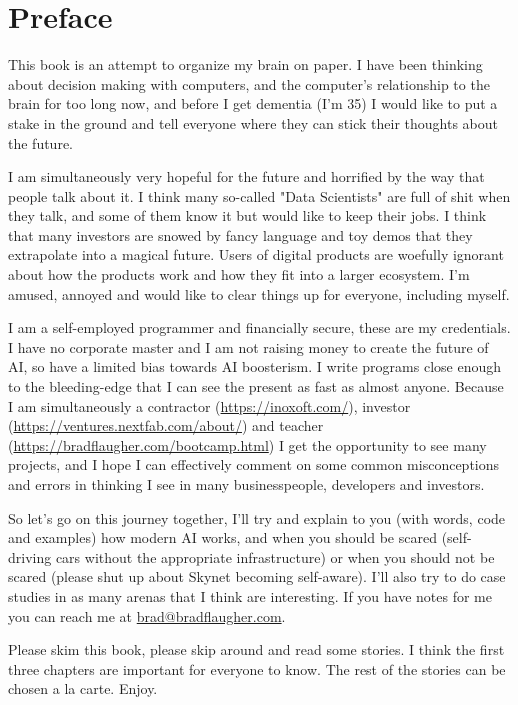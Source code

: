 \chapter*{Preface}

This book is an attempt to organize my brain on paper. I have been thinking about decision making with computers, and the computer's relationship to the brain for too long now, and before I get dementia (I'm 35) I would like to put a stake in the ground and tell everyone where they can stick their thoughts about the future. 

I am simultaneously very hopeful for the future and horrified by the way that people talk about it. I think many so-called "Data Scientists" are full of shit when they talk, and some of them know it but would like to keep their jobs. I think that many investors are snowed by fancy language and toy demos that they extrapolate into a magical future. Users of digital products are woefully ignorant about how the products work and how they fit into a larger ecosystem. I'm amused, annoyed and would like to clear things up for everyone, including myself.

I am a self-employed programmer and financially secure, these are my credentials. I have no corporate master and I am not raising money to create the future of AI, so have a limited bias towards AI boosterism. I write programs close enough to the bleeding-edge that I can see the present as fast as almost anyone. Because I am simultaneously a contractor (\url{https://inoxoft.com/}), investor (\url{https://ventures.nextfab.com/about/}) and teacher (\url{https://bradflaugher.com/bootcamp.html}) I get the opportunity to see many projects, and I hope I can effectively comment on some common misconceptions and errors in thinking I see in many businesspeople, developers and investors.

So let's go on this journey together, I'll try and explain to you (with words, code and examples) how modern AI works, and when you should be scared (self-driving cars without the appropriate infrastructure) or when you should not be scared (please shut up about Skynet becoming self-aware). I'll also try to do case studies in as many arenas that I think are interesting. If you have notes for me you can reach me at \href{mailto:brad@bradflaugher.com}{brad@bradflaugher.com}.

Please skim this book, please skip around and read some stories. I think the first three chapters are important for everyone to know. The rest of the stories can be chosen a la carte. Enjoy.

